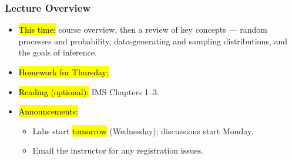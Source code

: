 
\begin{frame}
\frametitle{Lecture Overview}
    \begin{itemize}
        \item \hl{This time:} course overview, then a review of key concepts --- random processes and probability, data-generating and sampling distributions, and the goals of inference.
        \item \hl{Homework for Thursday:} 
        \item \hl{Reading (optional):} IMS Chapters 1--3.
        \item \hl{Announcements:}
        \begin{itemize}
            \item Labs start \hl{tomorrow} (Wednesday); discussions start Monday.
            \item Email the instructor for any registration issues.
        \end{itemize}
    \end{itemize}
\end{frame}
